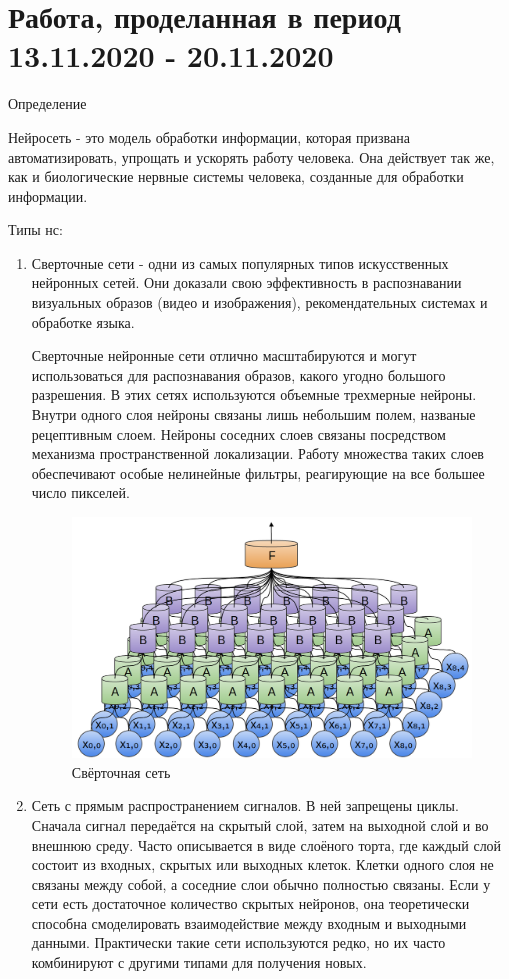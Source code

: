 \documentclass[12pt,a4paper]{report}
\begin{document}
	\section{Работа, проделанная в период 13.11.2020 - 20.11.2020}
	Определение 

Нейросеть  - это модель обработки информации, которая призвана автоматизировать, упрощать и ускорять работу человека. Она действует так же, как и биологические нервные системы человека, созданные для обработки информации. 

 Типы нс: 

\begin{enumerate}
\item Сверточные сети - одни из самых популярных типов искусственных нейронных сетей. Они доказали свою эффективность в распознавании визуальных образов (видео и изображения), рекомендательных системах и обработке языка.

Сверточные нейронные сети отлично масштабируются и могут использоваться для распознавания образов, какого угодно большого разрешения.
В этих сетях используются объемные трехмерные нейроны. Внутри одного слоя нейроны связаны лишь небольшим полем, названые рецептивным слоем.
Нейроны соседних слоев связаны посредством механизма пространственной локализации. Работу множества таких слоев обеспечивают особые нелинейные фильтры, реагирующие на все большее число пикселей.

\begin{figure}
	\centering
	\includegraphics[width=\columnwidth]{sv}
	\caption{Свёрточная сеть}
\end{figure}

\item Сеть с прямым распространением сигналов. В ней запрещены циклы. Сначала сигнал передаётся на скрытый слой, затем на выходной слой и во внешнюю среду. Часто описывается в виде слоёного торта, где каждый слой состоит из входных, скрытых или выходных клеток. Клетки одного слоя не связаны между собой, а соседние слои обычно полностью связаны. Если у сети есть достаточное количество скрытых нейронов, она теоретически способна смоделировать взаимодействие между входным и выходными данными. Практически такие сети используются редко, но их часто комбинируют с другими типами для получения новых.


\end{enumerate}
\end{document}
